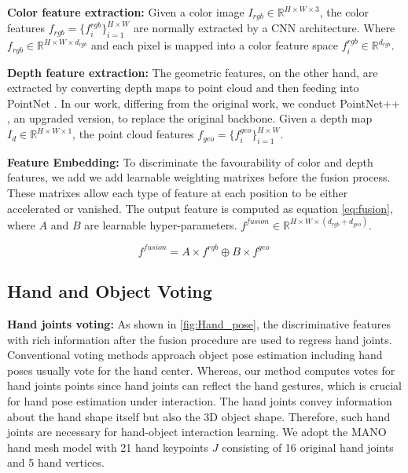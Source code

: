 \textbf{Color feature extraction:} Given a color image $I_{rgb} \in \mathbb{R}^{H \times W \times 3}$, the color features $f_{rgb} = \{ f^{rgb}_i \} ^{H \times W}_{i=1}$ are normally extracted by a CNN architecture. Where $f_{rgb} \in \mathbb{R}^{H \times W \times d_{rgb}}$ and each pixel is mapped into a color feature space $f^{rgb}_i \in \mathbb{R}^{d_{rgb}}$. 

\textbf{Depth feature extraction:} The geometric features, on the other hand, are extracted by converting depth maps to point cloud and then feeding into PointNet \cite{qi2017pointnet}. In our work, differing from the original work, we conduct PointNet++ \cite{qi2017pointnet++}, an upgraded version, to replace the original backbone. Given a depth map $I_d \in \mathbb{R}^{H \times W \times 1}$, the point cloud features $f_{geo} = \{f^{geo}_i\}^{H \times W}_{i=1}$.

\textbf{Feature Embedding:} To discriminate the favourability of color and depth features, we add we add learnable weighting matrixes before the fusion process. These matrixes allow each type of feature at each position to be either accelerated or vanished. The output feature is computed as equation \ref{eq:fusion}, where $A$ and $B$ are learnable hyper-parameters. $f^{fusion} \in \mathbb{R}^{H \times W \times (d_{rgb} + d_{geo})}$.


\begin{equation}
	f^{fusion} = A \times f^{rgb} \oplus B \times f^{geo} \
	\label{eq:fusion}
\end{equation}

\subsection{Hand and Object Voting}
\label{sec:voting}
\textbf{Hand joints voting:} As shown in \ref{fig:Hand_pose}, the discriminative features with rich information after the fusion procedure are used to regress hand joints. Conventional voting methods approach object pose estimation including hand poses usually vote for the hand center. Whereas, our method computes votes for hand joints points since hand joints can reflect the hand gestures, which is crucial for hand pose estimation under interaction. The hand joints convey information about the hand shape itself but also the 3D object shape. Therefore, such hand joints are necessary for hand-object interaction learning. We adopt the MANO hand mesh model \cite{romero2022embodied} with 21 hand keypoints $J$ consisting of 16 original hand joints and 5 hand vertices. 

